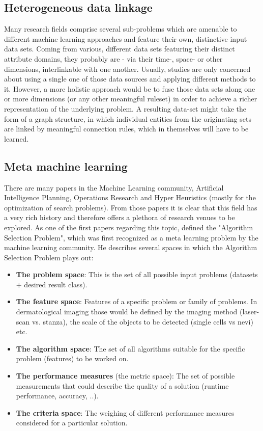 \subsection{Heterogeneous data linkage}
\label{ssect:heterogeneous_data}

Many research fields comprise several sub-problems which are amenable to different machine learning approaches and feature their own, distinctive input data sets. Coming from various, different data sets featuring their distinct attribute domains, they probably are - via their time-, space- or other dimensions, interlinkable with one another. Usually, studies are only concerned about using a single one of those data sources and applying different methods to it. However, a more holistic approach would be to fuse those data sets along one or more dimensions (or any other meaningful ruleset) in order to achieve a richer representation of the underlying problem. A resulting data-set might take the form of a graph structure, in which individual entities from the originating sets are linked by meaningful connection rules, which in themselves will have to be learned.


\subsection{Meta machine learning}
\label{ssect:meta_ml}

There are many papers in the Machine Learning community, Artificial Intelligence Planning, Operations Research and Hyper Heuristics (mostly for the optimization of search problems). From those papers it is clear that this field has a very rich history and therefore offers a plethora of research venues to be explored. As one of the first papers regarding this topic, \citep{Rice1975} defined the "Algorithm Selection Problem", which was first recognized as a meta learning problem by the machine learning community. He describes several spaces in which the Algorithm Selection Problem plays out:

\begin{itemize}
	\item \textbf{The problem space}: This is the set of all possible input problems (datasets + desired result class).
	
	\item \textbf{The feature space}: Features of a specific problem or family of problems. In dermatological imaging those would be defined by the imaging method (laser-scan vs. stanza), the scale of the objects to be detected (single cells vs nevi) etc.
	
	\item \textbf{The algorithm space}: The set of all algorithms suitable for the specific problem (features) to be worked on.
	
	\item \textbf{The performance measures} (the metric space): The set of possible measurements that could describe the quality of a solution (runtime performance, accuracy, ..).
	
	\item \textbf{The criteria space}: The weighing of different performance measures considered for a particular solution.
\end{itemize}

